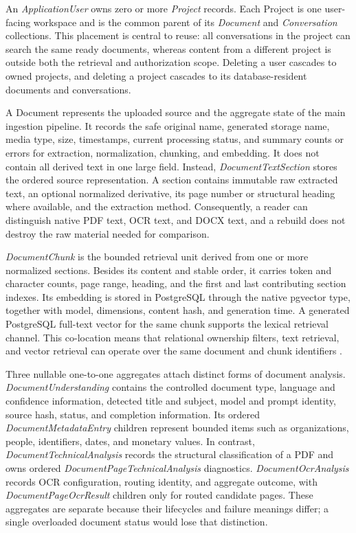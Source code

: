 An \emph{ApplicationUser} owns zero or more \emph{Project} records. Each
Project is one user-facing workspace and is the common parent of its
\emph{Document} and \emph{Conversation} collections. This placement is central
to reuse: all conversations in the project can search the same ready documents,
whereas content from a different project is outside both the retrieval and
authorization scope. Deleting a user cascades to owned projects, and deleting a
project cascades to its database-resident documents and conversations.

A Document represents the uploaded source and the aggregate state of the main
ingestion pipeline. It records the safe original name, generated storage name,
media type, size, timestamps, current processing status, and summary counts or
errors for extraction, normalization, chunking, and embedding. It does not
contain all derived text in one large field. Instead,
\emph{DocumentTextSection} stores the ordered source representation. A section
contains immutable raw extracted text, an optional normalized derivative, its
page number or structural heading where available, and the extraction method.
Consequently, a reader can distinguish native PDF text, OCR text, and DOCX
text, and a rebuild does not destroy the raw material needed for comparison.

\emph{DocumentChunk} is the bounded retrieval unit derived from one or more
normalized sections. Besides its content and stable order, it carries token and
character counts, page range, heading, and the first and last contributing
section indexes. Its embedding is stored in PostgreSQL through the native
pgvector type, together with model, dimensions, content hash, and generation
time. A generated PostgreSQL full-text vector for the same chunk supports the
lexical retrieval channel. This co-location means that relational ownership
filters, text retrieval, and vector retrieval can operate over the same
document and chunk identifiers \cite{PostgreSQLFTS,PgvectorDocs}.

Three nullable one-to-one aggregates attach distinct forms of document
analysis. \emph{DocumentUnderstanding} contains the controlled document type,
language and confidence information, detected title and subject, model and
prompt identity, source hash, status, and completion information. Its ordered
\emph{DocumentMetadataEntry} children represent bounded items such as
organizations, people, identifiers, dates, and monetary values. In contrast,
\emph{DocumentTechnicalAnalysis} records the structural classification of a
PDF and owns ordered \emph{DocumentPageTechnicalAnalysis} diagnostics.
\emph{DocumentOcrAnalysis} records OCR configuration, routing identity, and
aggregate outcome, with \emph{DocumentPageOcrResult} children only for routed
candidate pages. These aggregates are separate because their lifecycles and
failure meanings differ; a single overloaded document status would lose that
distinction.

